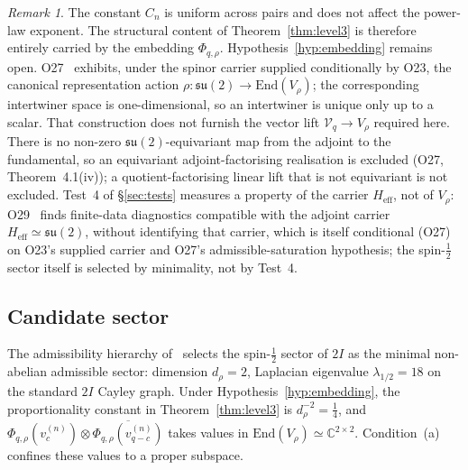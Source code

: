 \documentclass[12pt,a4paper]{article}
\theoremstyle{definition}
\theoremstyle{remark}
\newtheorem{remark}[theorem]{Remark}
\begin{document}
    \begin{remark}
      The constant $C_n$ is uniform across pairs and does not affect the power-law
      exponent.
      The structural content of Theorem~\ref{thm:level3} is therefore entirely
      carried by the embedding $\Phi_{q,\rho}$.
      Hypothesis~\ref{hyp:embedding} remains open.
      O27~\cite{Beau2026a31} exhibits, under the spinor carrier supplied conditionally by O23, the
      canonical representation action $\rho \colon \mathfrak{su}(2) \to \mathrm{End}(V_\rho)$; the
      corresponding intertwiner space is one-dimensional, so an intertwiner is unique only up to a
      scalar.
      That construction does not furnish the vector lift $\mathcal{V}_q \to V_\rho$ required here.
      There is no non-zero $\mathfrak{su}(2)$-equivariant map from the adjoint to the fundamental,
      so an equivariant adjoint-factorising realisation is excluded (O27, Theorem~4.1(iv)); a
      quotient-factorising linear lift that is not equivariant is not excluded.
      Test~4 of §\ref{sec:tests} measures a property of the carrier $H_{\mathrm{eff}}$, not of $V_\rho$:
      O29~\cite{Beau2026a33} finds finite-data diagnostics compatible with the adjoint carrier
      $H_{\mathrm{eff}} \simeq \mathfrak{su}(2)$, without identifying that carrier, which is itself
      conditional (O27) on O23's supplied carrier and O27's admissible-saturation hypothesis; the spin-$\tfrac{1}{2}$
      sector itself is selected by minimality, not by
      Test~4.
    \end{remark}

  \subsection{Candidate sector}
    \label{sec:candidate}

    The admissibility hierarchy of~\cite{Beau2026a1} selects the spin-$\frac{1}{2}$
    sector of $2I$ as the minimal non-abelian admissible sector: dimension $d_\rho = 2$,
    Laplacian eigenvalue $\lambda_{1/2} = 18$ on the standard $2I$ Cayley graph.
    Under Hypothesis~\ref{hyp:embedding}, the proportionality constant in
    Theorem~\ref{thm:level3} is $d_\rho^{-2} = \tfrac{1}{4}$, and
    $\Phi_{q,\rho}(v_c^{(n)}) \otimes \overline{\Phi_{q,\rho}(v_{q-c}^{(n)})}$
    takes values in $\mathrm{End}(V_\rho) \simeq \mathbb{C}^{2 \times 2}$.
    Condition~(a) confines these values to a proper subspace.
\end{document}
